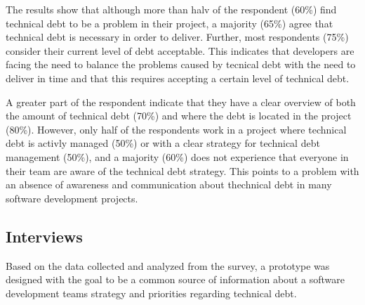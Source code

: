 

The results show that although more than halv of the respondent (60\%) find technical debt to be a problem in their project, a majority (65\%) agree that technical debt is necessary in order to deliver.
Further, most respondents (75\%) consider their current level of debt acceptable.
This indicates that developers are facing the need to balance the problems caused by tecnical debt with the need to deliver in time and that this requires accepting a certain level of technical debt.

A greater part of the respondent indicate that they have a clear overview of both the amount of technical debt (70\%) and where the debt is located in the project (80\%).
However, only half of the respondents work in a project where technical debt is activly managed (50\%) or with a clear strategy for technical debt management (50\%), and a majority (60\%) does not experience that everyone in their team are aware of the technical debt strategy.
This points to a problem with an absence of awareness and communication about thechnical debt in many software development projects.

\subsection{Interviews}
Based on the data collected and analyzed from the survey, a prototype was designed with the goal to be a common source of information about a software development teams strategy and priorities regarding technical debt.
